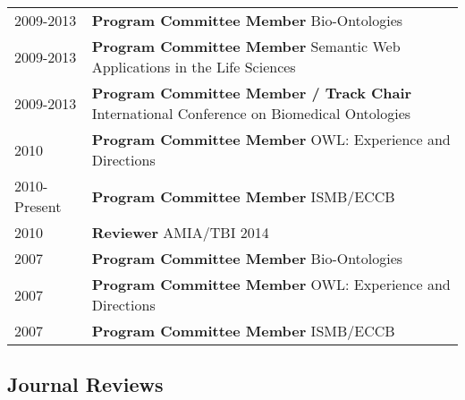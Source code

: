 \documentclass[11pt,fullpage]{article}
\begin{document}
\begin{longtable}{p{0.5in}|p{5.5in}}
  2009-2013  & \textbf{Program Committee Member} Bio-Ontologies \\
  2009-2013 & \textbf{Program Committee Member} Semantic Web  Applications in the Life Sciences\\
  2009-2013 & \textbf{Program Committee Member / Track Chair} International Conference on Biomedical Ontologies\\
  2010 & \textbf{Program Committee Member} OWL: Experience and Directions \\
  2010-Present & \textbf{Program Committee Member} ISMB/ECCB \\
  2010  & \textbf{Reviewer} AMIA/TBI 2014 \\
  2007 & \textbf{Program Committee Member} Bio-Ontologies \\
  2007 & \textbf{Program Committee Member} OWL: Experience and Directions \\
  2007 & \textbf{Program Committee Member} ISMB/ECCB \\

\end{longtable}

\subsection*{Journal Reviews}
\end{document}
